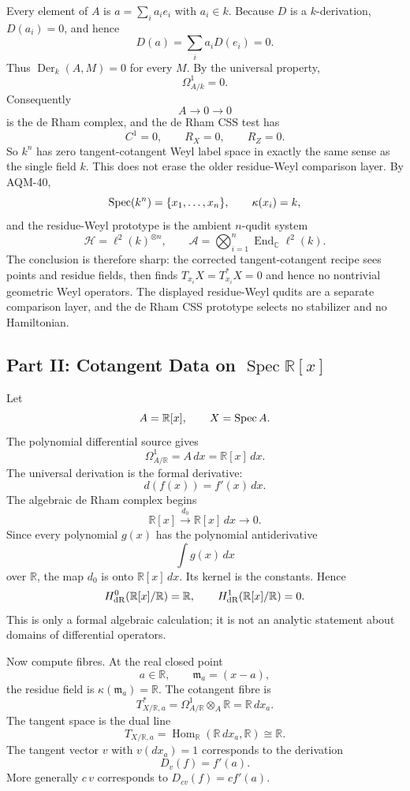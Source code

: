 Every element of \(A\) is \(a=\sum_i a_i e_i\) with \(a_i\in k\).  Because
\(D\) is a \(k\)-derivation, \(D(a_i)=0\), and hence
\[
  D(a)=\sum_i a_iD(e_i)=0.
\]
Thus \(\operatorname{Der}_k(A,M)=0\) for every \(M\).  By the universal
property,
\[
  \Omega^1_{A/k}=0.
\]
Consequently
\[
  A\longrightarrow 0\longrightarrow0
\]
is the de Rham complex, and the de Rham CSS test has
\[
  C^1=0,\qquad R_X=0,\qquad R_Z=0.
\]
So \(k^n\) has zero tangent-cotangent Weyl label space in exactly the same
sense as the single field \(k\).  This does not erase the older residue-Weyl
comparison layer.  By AQM-40,
\[
  \operatorname{Spec}(k^n)=\{x_1,\ldots,x_n\},\qquad \kappa(x_i)=k,
\]
and the residue-Weyl prototype is the ambient \(n\)-qudit system
\[
  \mathcal H=\ell^2(k)^{\otimes n},\qquad
  \mathcal A=\bigotimes_{i=1}^n\operatorname{End}_{\mathbb C}\ell^2(k).
\]
The conclusion is therefore sharp: the corrected tangent-cotangent recipe sees
points and residue fields, then finds \(T_{x_i}X=T^*_{x_i}X=0\) and hence no
nontrivial geometric Weyl operators.  The displayed residue-Weyl qudits are a
separate comparison layer, and the de Rham CSS prototype selects no stabilizer
and no Hamiltonian.
\subsection{Part II: Cotangent Data on \texorpdfstring{\(\operatorname{Spec}\mathbb R[x]\)}{Spec R[x]}}
Let
\[
  A=\mathbb R[x],\qquad X=\operatorname{Spec} A.
\]
The polynomial differential source gives
\[
  \Omega^1_{A/\mathbb R}=A\,dx=\mathbb R[x]\,dx.
\]
The universal derivation is the formal derivative:
\[
  d(f(x))=f'(x)\,dx.
\]
The algebraic de Rham complex begins
\[
  \mathbb R[x]\xrightarrow{d_0}\mathbb R[x]\,dx\longrightarrow0.
\]
Since every polynomial \(g(x)\) has the polynomial antiderivative
\[
  \int g(x)\,dx
\]
over \(\mathbb R\), the map \(d_0\) is onto \(\mathbb R[x]\,dx\).  Its kernel
is the constants.  Hence
\[
  H^0_{\rm dR}(\mathbb R[x]/\mathbb R)=\mathbb R,\qquad
  H^1_{\rm dR}(\mathbb R[x]/\mathbb R)=0.
\]
This is only a formal algebraic calculation; it is not an analytic statement
about domains of differential operators.

Now compute fibres.  At the real closed point
\[
  a\in\mathbb R,\qquad \mathfrak m_a=(x-a),
\]
the residue field is \(\kappa(\mathfrak m_a)=\mathbb R\).  The cotangent
fibre is
\[
  T^*_{X/\mathbb R,a}
  =
  \Omega^1_{A/\mathbb R}\otimes_A\mathbb R
  =
  \mathbb R\,dx_a.
\]
The tangent space is the dual line
\[
  T_{X/\mathbb R,a}
  =
  \operatorname{Hom}_{\mathbb R}(\mathbb R\,dx_a,\mathbb R)
  \cong\mathbb R.
\]
The tangent vector \(v\) with \(v(dx_a)=1\) corresponds to the derivation
\[
  D_v(f)=f'(a).
\]
More generally \(c\,v\) corresponds to \(D_{c v}(f)=c f'(a)\).

